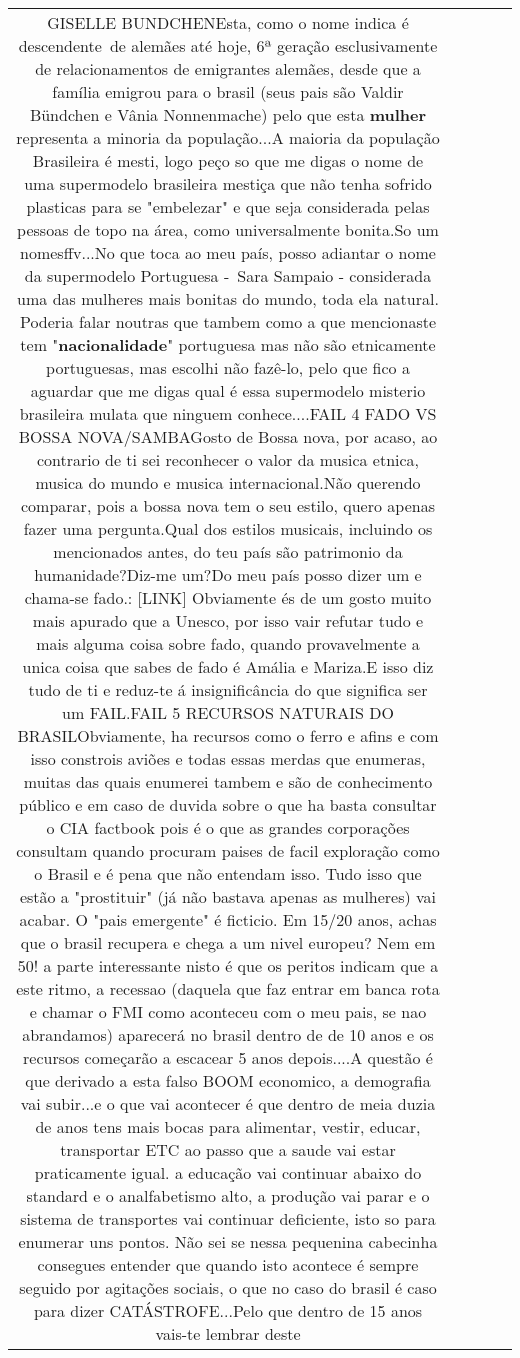 \documentclass[11pt]{article}
\newlength\mylength
\begin{document}
\begin{center}
\begin{longtable}{|C{.65\mylength}|C{.30\mylength}|C{.12\mylength}|C{.12\mylength}|C{.12\mylength}|}
GISELLE BUNDCHENEsta, como o nome indica é descendente de alemães até hoje, 6ª geração esclusivamente de relacionamentos de emigrantes alemães, desde que a família emigrou para o brasil (seus pais são Valdir Bündchen e Vânia Nonnenmache) pelo que esta \textbf{mulher} representa a minoria da população...A maioria da população Brasileira é mesti, logo peço so que me digas o nome de uma supermodelo brasileira mestiça que não tenha sofrido plasticas para se "embelezar" e que seja considerada pelas pessoas de topo na área, como universalmente bonita.So um nomesffv...No que toca ao meu país, posso adiantar o nome da supermodelo Portuguesa - Sara Sampaio - considerada uma das mulheres mais bonitas do mundo, toda ela natural. Poderia falar noutras que tambem como a que mencionaste tem "\textbf{nacionalidade}" portuguesa mas não são etnicamente portuguesas, mas escolhi não fazê-lo, pelo que fico a aguardar que me digas qual é essa supermodelo misterio brasileira mulata que ninguem conhece....FAIL 4 FADO VS BOSSA NOVA/SAMBAGosto de Bossa nova, por acaso, ao contrario de ti sei reconhecer o valor da musica etnica, musica do mundo e musica internacional.Não querendo comparar, pois a bossa nova tem o seu estilo, quero apenas fazer uma pergunta.Qual dos estilos musicais, incluindo os mencionados antes, do teu país são patrimonio da humanidade?Diz-me um?Do meu país posso dizer um e chama-se fado.: [LINK] Obviamente és de um gosto muito mais apurado que a Unesco, por isso vair refutar tudo e mais alguma coisa sobre fado, quando provavelmente a unica coisa que sabes de fado é Amália e Mariza.E isso diz tudo de ti e reduz-te á insignificância do que significa ser um FAIL.FAIL 5 RECURSOS NATURAIS DO BRASILObviamente, ha recursos como o ferro e afins e com isso constrois aviões e todas essas merdas que enumeras, muitas das quais enumerei tambem e são de conhecimento público e em caso de duvida sobre o que ha basta consultar o CIA factbook pois é o que as grandes corporações consultam quando procuram paises de facil exploração como o Brasil e é pena que não entendam isso. Tudo isso que estão a "prostituir" (já não bastava apenas as mulheres) vai acabar. O "pais emergente" é ficticio. Em 15/20 anos, achas que o brasil recupera e chega a um nivel europeu? Nem em 50! a parte interessante nisto é que os peritos indicam que a este ritmo, a recessao (daquela que faz entrar em banca rota e chamar o FMI como aconteceu com o meu pais, se nao abrandamos) aparecerá no brasil dentro de de 10 anos e os recursos começarão a escacear 5 anos depois....A questão é que derivado a esta falso BOOM economico, a demografia vai subir...e o que vai acontecer é que dentro de meia duzia de anos tens mais bocas para alimentar, vestir, educar, transportar ETC ao passo que a saude vai estar praticamente igual. a educação vai continuar abaixo do standard e o analfabetismo alto, a produção vai parar e o sistema de transportes vai continuar deficiente, isto so para enumerar uns pontos. Não sei se nessa pequenina cabecinha consegues entender que quando isto acontece é sempre seguido por agitações sociais, o que no caso do brasil é caso para dizer CATÁSTROFE...Pelo que dentro de 15 anos vais-te lembrar deste 
\end{longtable}
\end{center}
\end{document}

